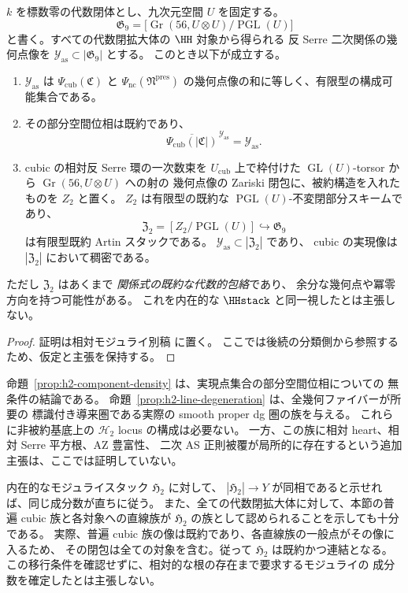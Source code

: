 \begin{proposition}
\label{prop:h2-constructible-relations-and-irreducible-closure}
$k$ を標数零の代数閉体とし、九次元空間 $U$ を固定する。
\[
 \mathfrak G_9=
 \bigl[\operatorname{Gr}(56,U\otimes U)/\operatorname{PGL}(U)\bigr]
\]
と書く。すべての代数閉拡大体の $\HH$ 対象から得られる
反 Serre 二次関係の幾何点像を
$\mathcal Y_{\mathrm{as}}\subset|\mathfrak G_9|$ とする。
このとき以下が成立する。
\begin{enumerate}
\item $\mathcal Y_{\mathrm{as}}$ は
  $\Psi_{\mathrm{cub}}(\mathfrak C)$ と
  $\Psi_{\mathrm{nc}}(\mathfrak N^{\mathrm{pres}})$
  の幾何点像の和に等しく、有限型の構成可能集合である。
\item その部分空間位相は既約であり、
  \[
   \overline{\Psi_{\mathrm{cub}}(|\mathfrak C|)}
           ^{\,\mathcal Y_{\mathrm{as}}}
     =\mathcal Y_{\mathrm{as}} .
  \]
\item cubic の相対反 Serre 環の一次数束を
  $U_{\mathrm{cub}}$ 上で枠付けた
  $\operatorname{GL}(U)$-torsor から
  $\operatorname{Gr}(56,U\otimes U)$ への射の
  幾何点像の Zariski 閉包に、被約構造を入れたものを
  $Z_2$ と置く。
  $Z_2$ は有限型の既約な
  $\operatorname{PGL}(U)$-不変閉部分スキームであり、
  \[
    \mathfrak Z_2=[Z_2/\operatorname{PGL}(U)]
       \hookrightarrow\mathfrak G_9
       \tag{H2-envelope}\label{eq:h2-irreducible-envelope}
  \]
  は有限型既約 Artin スタックである。
  $\mathcal Y_{\mathrm{as}}\subset|\mathfrak Z_2|$ であり、
  cubic の実現像は $|\mathfrak Z_2|$ において稠密である。
\end{enumerate}
ただし $\mathfrak Z_2$ はあくまで
\emph{関係式の既約な代数的包絡}であり、
余分な幾何点や冪零方向を持つ可能性がある。
これを内在的な $\HHstack$ と同一視したとは主張しない。
\end{proposition}
\begin{proof}
証明は相対モジュライ別稿 \cite[\texttt{foundation_stack} 節]{QuadricModuli2026} に置く。
ここでは後続の分類側から参照するため、仮定と主張を保持する。
\end{proof}

\begin{remark}[内在的な相対モジュライへの移行条件]
命題~\ref{prop:h2-component-density} は、実現点集合の部分空間位相についての
無条件の結論である。
命題~\ref{prop:h2-line-degeneration} は、全幾何ファイバーが所要の
標識付き導来圏である実際の smooth proper dg 圏の族を与える。
これらに非被約基底上の $\mathcal H_2$ locus の構成は必要ない。
一方、この族に相対 heart、相対 Serre 平方根、AZ 豊富性、
二次 AS 正則被覆が局所的に存在するという追加主張は、ここでは証明していない。

内在的なモジュライスタック $\mathfrak H_2$ に対して、
$|\mathfrak H_2|\to Y$ が同相であると示せれば、同じ成分数が直ちに従う。
また、全ての代数閉拡大体に対して、本節の普遍 cubic 族と各対象への直線族が
$\mathfrak H_2$ の族として認められることを示しても十分である。
実際、普遍 cubic 族の像は既約であり、各直線族の一般点がその像に入るため、
その閉包は全ての対象を含む。従って $\mathfrak H_2$ は既約かつ連結となる。
この移行条件を確認せずに、相対的な根の存在まで要求するモジュライの
成分数を確定したとは主張しない。
\end{remark}

